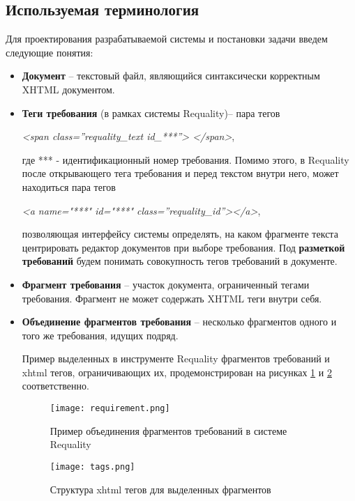 \subsection{Используемая терминология}
Для проектирования разрабатываемой системы и постановки задачи введем следующие понятия:
\begin{itemize}
\item \textbf{Документ} – текстовый файл, являющийся синтаксически корректным XHTML документом.
\item \textbf{Теги требования} (в рамках системы Requality)– пара тегов

\emph{<span class=”requality\_text id\_***”> 	</span>},

где *** - идентификационный номер требования. Помимо этого, в Requality после открывающего тега требования и перед текстом внутри него, может находиться пара тегов 

\emph{<a name="***" id="***" class=”requality\_id”></a>},

позволяющая интерфейсу системы определять, на каком фрагменте текста центрировать редактор документов при выборе требования. Под \textbf{разметкой требований} будем понимать совокупность тегов требований в документе.

\item \textbf{Фрагмент требования} – участок документа, ограниченный тегами требования. Фрагмент не может содержать XHTML теги внутри себя.

\item \textbf{Объединение фрагментов требования} – несколько фрагментов одного и того же требования, идущих подряд.

Пример выделенных в инструменте Requality фрагментов требований и xhtml тегов, ограничивающих их, продемонстрирован на рисунках \ref{intro:image2} и \ref{intro:image3} соответственно.

\begin{figure}[h]
\begin{center}
\texttt{[image: requirement.png]}
\caption{Пример объединения фрагментов требований в системе Requality}
\label{intro:image2}
\end{center}
\end{figure}

\begin{figure}[h]
\begin{center}
\texttt{[image: tags.png]}
\caption{Структура xhtml тегов для выделенных фрагментов}
\label{intro:image3}
\end{center}
\end{figure}


\end{itemize}
